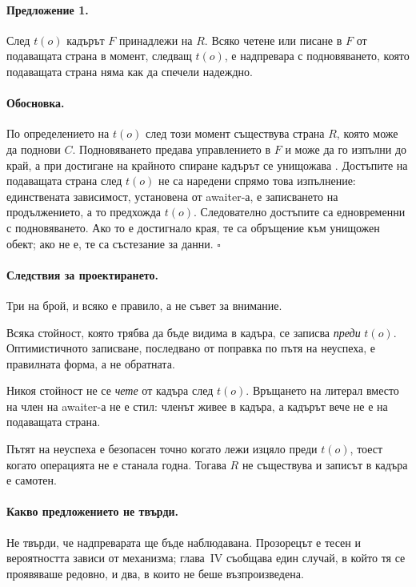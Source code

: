 \paragraph{Предложение 1.} След \(t(o)\) кадърът \(F\) принадлежи на \(R\). Всяко четене или
писане в \(F\) от подаващата страна в момент, следващ \(t(o)\), е надпревара с подновяването,
която подаващата страна няма как да спечели надеждно.

\paragraph{Обосновка.} По определението на \(t(o)\) след този момент съществува страна \(R\),
която може да поднови \(C\). Подновяването предава управлението в \(F\) и може да го изпълни
до край, а при достигане на крайното спиране кадърът се унищожава \cite{cpp20standard}.
Достъпите на подаващата страна след \(t(o)\) не са наредени спрямо това изпълнение:
единствената зависимост, установена от awaiter-а, е записването на продължението, а то
предхожда \(t(o)\). Следователно достъпите са едновременни с подновяването. Ако то е
достигнало края, те са обръщение към унищожен обект; ако не е, те са състезание за данни.
\(\square\)

\paragraph{Следствия за проектирането.} Три на брой, и всяко е правило, а не съвет за
внимание.

Всяка стойност, която трябва да бъде видима в кадъра, се записва \emph{преди} \(t(o)\).
Оптимистичното записване, последвано от поправка по пътя на неуспеха, е правилната форма, а
не обратната.

Никоя стойност не се \emph{чете} от кадъра след \(t(o)\). Връщането на литерал вместо на член
на awaiter-а не е стил: членът живее в кадъра, а кадърът вече не е на подаващата страна.

Пътят на неуспеха е безопасен точно когато лежи изцяло преди \(t(o)\), тоест когато
операцията не е станала годна. Тогава \(R\) не съществува и записът в кадъра е самотен.

\paragraph{Какво предложението не твърди.} Не твърди, че надпреварата ще бъде наблюдавана.
Прозорецът е тесен и вероятността зависи от механизма; глава~IV съобщава един случай, в който
тя се проявяваше редовно, и два, в които не беше възпроизведена.

